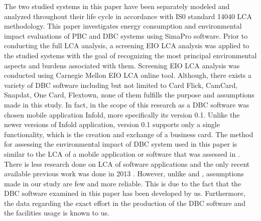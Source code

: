 \documentclass[conference]{IEEEtran}
\begin{document}
The two studied systems in this paper have been separately modeled and analyzed throughout their life cycle in accordance with IS0 standard 14040 LCA methodology. This paper investigates energy consumption and environmental impact evaluations of PBC and DBC systems using SimaPro software. Prior to conducting the full LCA analysis, a screening EIO LCA analysis was applied to the studied systems with the goal of recognizing the most principal environmental aspects and burdens associated with them. Screening EIO LCA analysis was conducted using Carnegie Mellon EIO LCA online tool. Although, there exists a variety of DBC software including but not limited to Card Flick, CamCard, Snapdat, One Card, Flextown, none of them fulfills the purpose and assumptions made in this study. In fact, in the scope of this research as a DBC software was chosen mobile application Infold, more specifically its version 0.1. Unlike the newer versions of Infold application, version 0.1 supports only a single functionality, which is the creation and exchange of a business card. The method for assessing the environmental impact of DBC system used in this paper is similar to the LCA of a mobile application or software that was assessed in \cite{moshnyaga2013assessment, Moshnyaga:2013}. There is less research done on LCA of software applications and the only recent available previous work was done in 2013 \cite{moshnyaga2013assessment, Moshnyaga:2013}. However, unlike \cite{moshnyaga2013assessment} and \cite{Moshnyaga:2013}, assumptions made in our study are few and more reliable. This is due to the fact that the DBC software examined in this paper has been developed by us. Furthermore, the data regarding the exact effort in the production of the DBC software and the facilities usage is known to us.
\end{document}
